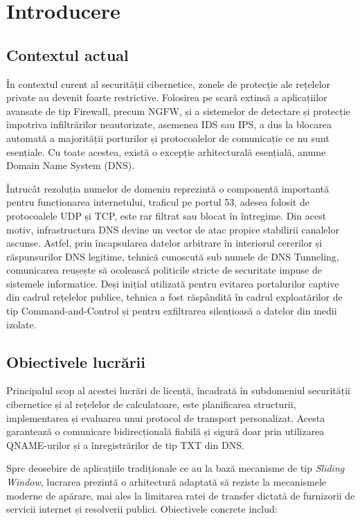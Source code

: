 \section{Introducere}

\subsection{Contextul actual}
În contextul curent al securității cibernetice, zonele de protecție ale rețelelor private au devenit foarte restrictive. Folosirea pe scară extinsă a aplicațiilor avansate de tip Firewall, precum NGFW, și a sistemelor de detectare și protecție împotriva infiltrărilor neautorizate, asemenea IDS sau IPS, a dus la blocarea automată a majorității porturilor și protocoalelor de comunicație ce nu sunt esențiale. Cu toate acestea, există o excepție arhitecturală esențială, anume Domain Name System (DNS).

Întrucât rezoluția numelor de domeniu reprezintă o componentă importantă pentru funcționarea internetului, traficul pe portul 53, adesea folosit de protocoalele UDP și TCP, este rar filtrat sau blocat în întregime. Din acest motiv, infrastructura DNS devine un vector de atac propice stabilirii canalelor ascunse. Astfel, prin încapsularea datelor arbitrare în interiorul cererilor și răspunsurilor DNS legitime, tehnică cunoscută sub numele de DNS Tunneling, comunicarea reușește să ocolească politicile stricte de securitate impuse de sistemele informatice. Deși inițial utilizată pentru evitarea portalurilor captive din cadrul rețelelor publice, tehnica a fost răspândită în cadrul exploatărilor de tip Command-and-Control și pentru exfiltrarea silențioasă a datelor din medii izolate. 

\subsection{Obiectivele lucrării}
Principalul scop al acestei lucrări de licență, încadrată în subdomeniul securității cibernetice și al rețelelor de calculatoare, este planificarea structurii, implementarea și evaluarea unui protocol de transport personalizat. Acesta garantează o comunicare bidirecțională fiabilă și sigură doar prin utilizarea QNAME-urilor și a înregistrărilor de tip TXT din DNS.

Spre deosebire de aplicațiile tradiționale ce au la bază mecanisme de tip \textit{Sliding Window}, lucrarea prezintă o arhitectură adaptată să reziste la mecanismele moderne de apărare, mai ales la limitarea ratei de transfer dictată de furnizorii de servicii internet și resolverii publici. Obiectivele concrete includ:

